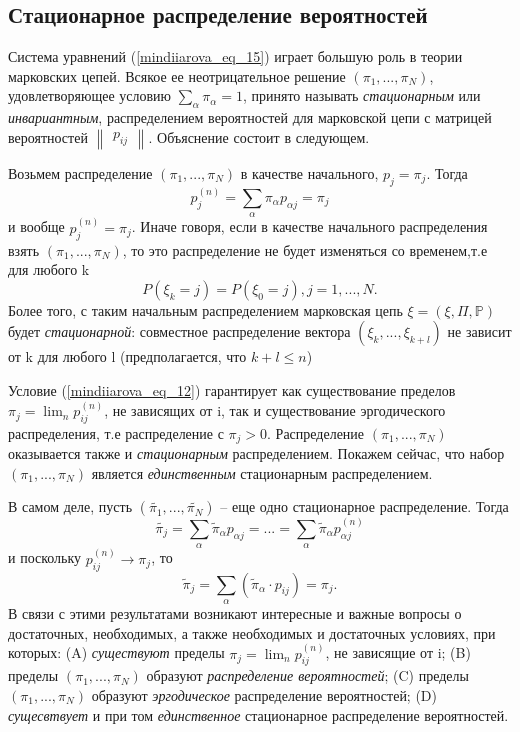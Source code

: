 \subsection{Стационарное распределение вероятностей}
 Система уравнений (\ref{mindiiarova_eq_15}) играет большую роль в теории марковских цепей.
 Всякое ее неотрицательное решение $(\pi_1, ..., \pi_N)$, удовлетворяющее условию $\sum\limits_{\alpha}\pi_{\alpha} = 1$, принято называть \textit{стационарным} или \textit{инвариантным}, распределением вероятностей для марковской цепи с матрицей вероятностей 
 $
 \begin{Vmatrix}
    p_{ij}
\end{Vmatrix}.$
Объяснение состоит в следующем.


Возьмем распределение $(\pi_1, ..., \pi_N)$ в качестве начального, $p_j=\pi_j$. Тогда 
\begin{equation} \label{trivial}
     p_j^{(n)} = \sum\limits_{\alpha}\pi_{\alpha}p_{\alpha j}= \pi_j
\end{equation}
и вообще $p_j^{(n)} =\pi_j$. Иначе говоря, если в качестве начального распределения взять  $(\pi_1, ..., \pi_N)$, то это распределение не будет изменяться со временем,т.е для любого k
\begin{equation} \label{trivial}
     P(\xi_k=j) =  P(\xi_0=j), j = 1, ..., N.
\end{equation}
Более того, с таким начальным распределением марковская цепь $\xi = (\xi, \Pi,\mathbb{P})$ будет \textit{стационарной}: совместное распределение вектора $(\xi_k, ..., \xi_{k+l})$ не зависит от k для любого l (предполагается, что $k+l\leq n$)


Условие (\ref{mindiiarova_eq_12}) гарантирует как существование пределов $\pi_j = \lim_{n}p_{i j }^{(n)}$, не зависящих от i, так и существование эргодического распределения, т.е распределение с $\pi_j>0$. Распределение $(\pi_1, ..., \pi_N)$ оказывается также и \textit{стационарным} распределением. Покажем сейчас, что набор $(\pi_1, ..., \pi_N)$ является \textit{единственным} стационарным распределением.


В самом деле, пусть $(\tilde{\pi_1}, ..., \tilde{\pi_N})$ -- еще одно стационарное распределение. Тогда
\begin{equation} \label{trivial}
     \tilde{\pi_j} = \sum\limits_{\alpha}\tilde{\pi}_{\alpha}p_{\alpha j} = 
     ... = \sum\limits_{\alpha}\tilde{\pi}_{\alpha}p_{\alpha j}^{(n)}
\end{equation}
и поскольку $p_{i j}^{(n)} \rightarrow  \pi_j$, то
\begin{equation} \label{trivial}
     \tilde{\pi}_j= \sum\limits_{\alpha}(\tilde{\pi}_{\alpha} \cdot p_{i j})=\pi_j.
\end{equation}
В связи с этими результатами возникают интересные и важные вопросы о достаточных, необходимых, а также необходимых и достаточных условиях, при которых: (A)  \textit{существуют} пределы $\pi_j=\lim_{n}p_{i j}^{(n)}$, не зависящие от i; (B) пределы $(\pi_1, ..., \pi_N)$ образуют  \textit{распределение вероятностей}; (C) пределы $(\pi_1, ..., \pi_N)$ образуют \textit{эргодическое} распределение вероятностей; (D) \textit{сущесвтвует} и при том \textit{единственное} стационарное распределение вероятностей.
